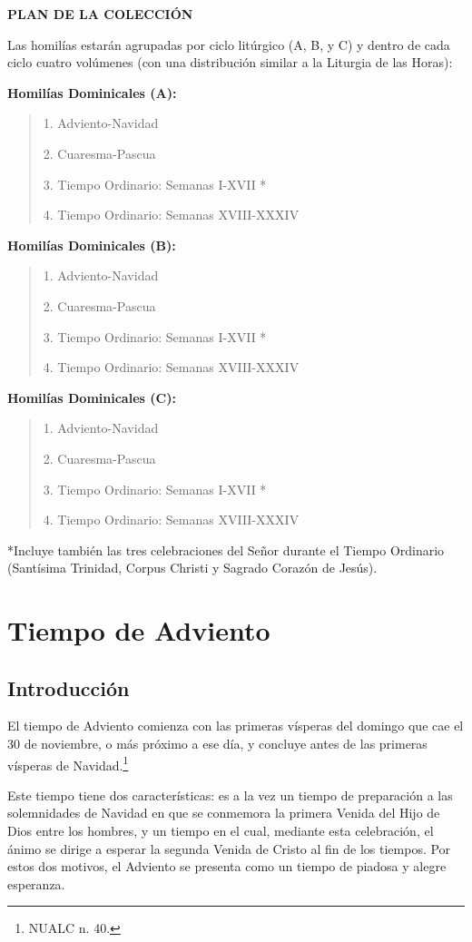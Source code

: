 \documentclass[]{article}
\begin{document}
\textbf{PLAN DE LA COLECCIÓN}

Las homilías estarán agrupadas por ciclo litúrgico (A, B, y C) y dentro
de cada ciclo cuatro volúmenes (con una distribución similar a la
Liturgia de las Horas):

\textbf{Homilías Dominicales (A):}

\begin{quote}
1. Adviento-Navidad

2. Cuaresma-Pascua

3. Tiempo Ordinario: Semanas I-XVII *

4. Tiempo Ordinario: Semanas XVIII-XXXIV
\end{quote}

\textbf{Homilías Dominicales (B):}

\begin{quote}
1. Adviento-Navidad

2. Cuaresma-Pascua

3. Tiempo Ordinario: Semanas I-XVII *

4. Tiempo Ordinario: Semanas XVIII-XXXIV
\end{quote}

\textbf{Homilías Dominicales (C):}

\begin{quote}
1. Adviento-Navidad

2. Cuaresma-Pascua

3. Tiempo Ordinario: Semanas I-XVII *

4. Tiempo Ordinario: Semanas XVIII-XXXIV
\end{quote}

*Incluye también las tres celebraciones del Señor durante el Tiempo
Ordinario (Santísima Trinidad, Corpus Christi y Sagrado Corazón de
Jesús).

\section{Tiempo de Adviento}\label{tiempo-de-adviento}

\subsection{Introducción}\label{introducciuxf3n}

El tiempo de Adviento comienza con las primeras vísperas del domingo que
cae el 30 de noviembre, o más próximo a ese día, y concluye antes de las
primeras vísperas de Navidad.\footnote{NUALC n. 40.}

Este tiempo tiene dos características: es a la vez un tiempo de
preparación a las solemnidades de Navidad en que se conmemora la primera
Venida del Hijo de Dios entre los hombres, y un tiempo en el cual,
mediante esta celebración, el ánimo se dirige a esperar la segunda
Venida de Cristo al fin de los tiempos. Por estos dos motivos, el
Adviento se presenta como un tiempo de piadosa y alegre esperanza.
\end{document}
